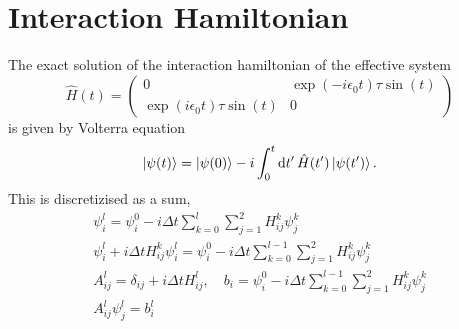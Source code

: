 \documentclass{article}
\begin{document}
\section*{Interaction Hamiltonian}
    The exact solution of the interaction hamiltonian of the effective system
    \begin{equation*}
        \hat H(t) = 
        \begin{pmatrix}
            0 & \exp(-i \epsilon_0 t) \tau \sin(t)\\
            \exp(i \epsilon_0 t) \tau \sin(t) & 0
        \end{pmatrix}
    \end{equation*}
    is given by Volterra equation
    \begin{equation*}
        \ket{\psi(t)} = \ket{\psi(0)} - i\int_0^t \dd{t'} \hat H(t')\ket{\psi(t')}.
    \end{equation*}
    This is discretizised as a sum,
    \begin{align*}
        \psi_i^l = \psi_i^0 - i \Delta t \sum_{k=0}^{l} \sum_{j=1}^2 H_{ij}^k \psi_j^k \\
        \psi_i^l + i \Delta t H_{ij}^k \psi_i^l = \psi_i^0 - i \Delta t \sum_{k=0}^{l-1} \sum_{j=1}^2 H_{ij}^k \psi_j^k \\
        A_{ij}^l = \delta_{ij} + i\Delta t H_{ij}^l, \quad b_i = \psi_i^0 - i \Delta t \sum_{k=0}^{l-1} \sum_{j=1}^2 H_{ij}^k \psi_j^k \\
        A_{ij}^l \psi_j^l = b_i^l
    \end{align*}
\end{document}
